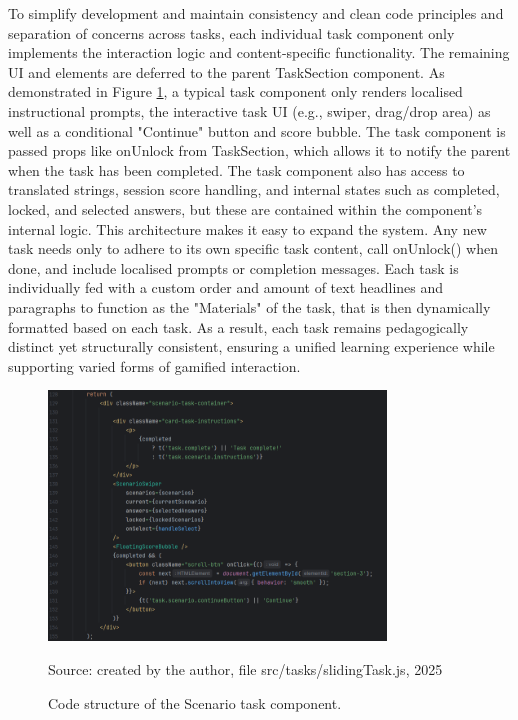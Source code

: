 To simplify development and maintain consistency and clean code principles and separation of concerns across tasks, each individual task component only implements the interaction logic and content-specific functionality. 
The remaining UI and elements are deferred to the parent TaskSection component. 
As demonstrated in Figure \ref{fig:task_layout}, a typical task component only renders localised instructional prompts, the interactive task UI (e.g., swiper, drag/drop area) as well as a conditional "Continue" button and score bubble. 
The task component is passed props like onUnlock from TaskSection, which allows it to notify the parent when the task has been completed.
The task component also has access to translated strings, session score handling, and internal states such as completed, locked, and selected answers, but these are contained within the component's internal logic.
This architecture makes it easy to expand the system. 
Any new task needs only to adhere to its own specific task content, call onUnlock() when done, and include localised prompts or completion messages. 
Each task is individually fed with a custom order and amount of text headlines and paragraphs to function as the "Materials" of the task, that is then dynamically formatted based on each task.
As a result, each task remains pedagogically distinct yet structurally consistent, ensuring a unified learning experience while supporting varied forms of gamified interaction.

\begin{figure}[hbtp]
\centering
\includegraphics[width=0.8\textwidth]{Media/task_layout.png}
\caption{Code structure of the Scenario task component.}
\label{fig:task_layout}
{\raggedright \small{Source: created by the author, file src/tasks/slidingTask.js, 2025}\par}
\end{figure}

